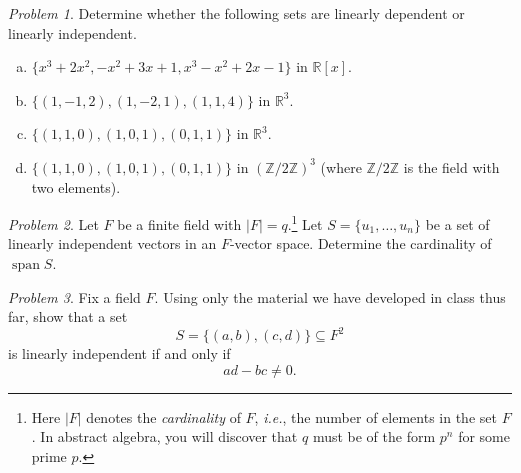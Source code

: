 \documentclass[11pt,twoside]{amsart}
\theoremstyle{plain}
\theoremstyle{remark}
\newtheorem{prob}{Problem}
\theoremstyle{definition}
\theoremstyle{definition}
\newcommand{\RR}{\mathbb{R}}
\newcommand{\R}{\mathbb{R}}
\newcommand{\Z}{\mathbb{Z}}
\newcommand{\spn}{\operatorname{span}}
\begin{document}
\begin{prob}
Determine whether the following sets are linearly dependent or linearly independent.
  \begin{enumerate}[(a)]
   \item $\{x^3+2x^2,-x^2+3x+1,x^3-x^2+2x-1\}$ in $\RR[x]$.
   \item $\{(1,-1,2),(1,-2,1),(1,1,4)\}$ in $\R^3$.
   \item $\{(1,1,0),(1,0,1),(0,1,1)\}$ in $\R^3$.
   \item $\{(1,1,0),(1,0,1),(0,1,1)\}$ in $(\Z/2\Z)^3$ (where $\Z/2\Z$ is the field with two elements).
  \end{enumerate}
\end{prob}

\begin{prob}
Let $F$ be a finite field with $|F|=q$.\footnote{Here $|F|$ denotes the \emph{cardinality} of $F$, \emph{i.e.}, the number of elements in the set $F$. In abstract algebra, you will discover that $q$ must be of the form $p^n$ for some prime $p$.} Let $S = \{u_1,\ldots,u_n\}$ be a set of linearly independent vectors in an $F$-vector space.  Determine the cardinality of $\spn S$.
\end{prob}

\begin{prob}
Fix a field $F$. Using only the material we have developed in class thus far, show that a set
\[
  S = \{(a,b),(c,d)\}\subseteq F^2
\]
is linearly independent if and only if
\[
  ad-bc \ne 0.
\]
\end{prob}
\end{document}
